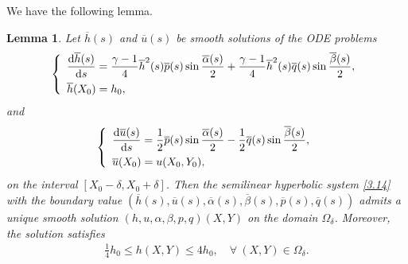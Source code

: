 \documentclass[11pt,reqno]{article}
\newtheorem{lem}{Lemma}
\newcommand{\dps}{\displaystyle}
\newcommand{\fr}{\frac}
\numberwithin{equation}{section}
\begin{document}
We have the following lemma.
\begin{lem}\label{lem3}
Let $\overline{h}(s)$ and $\overline{u}(s)$ be smooth solutions of the ODE problems
\begin{align}\label{4.5}
\left\{
\begin{array}{l}
\dps \fr{{\rm d}\overline{h}(s)}{{\rm d}s}=\fr{\gamma-1}{4}\overline{h}^2(s)\overline{p}(s)\sin\fr{\overline{\alpha}(s)}{2} +\fr{\gamma-1}{4}\overline{h}^2(s)\overline{q}(s)\sin\fr{\overline{\beta}(s)}{2}, \\[8pt]
\overline{h}(X_0)=h_0,
\end{array}
\right.
\end{align}
and
\begin{align}\label{4.5a}
\left\{
\begin{array}{l}
\dps \fr{{\rm d}\overline{u}(s)}{{\rm d}s}=\fr{1}{2}\overline{p}(s)\sin\fr{\overline{\alpha}(s)}{2} -\fr{1}{2}\overline{q}(s)\sin\fr{\overline{\beta}(s)}{2}, \\[8pt]
\overline{u}(X_0)=u(X_0, Y_0),
\end{array}
\right.
\end{align}
on the interval $[X_0-\delta, X_0+\delta]$. Then the semilinear hyperbolic system \eqref{3.14} with the boundary value $(\overline{h}(s), \overline{u}(s), \overline{\alpha}(s), \overline{\beta}(s), \overline{p}(s), \overline{q}(s))$ admits a unique smooth solution $(h, u, \alpha, \beta, p, q)(X,Y)$ on the domain $\Omega_\delta$. Moreover, the solution satisfies
\begin{align}\label{4.6}
\fr{1}{4}h_0\leq h(X,Y) \leq 4h_0,\quad \forall\ (X,Y)\in\Omega_\delta.
\end{align}
\end{lem}
\end{document}
